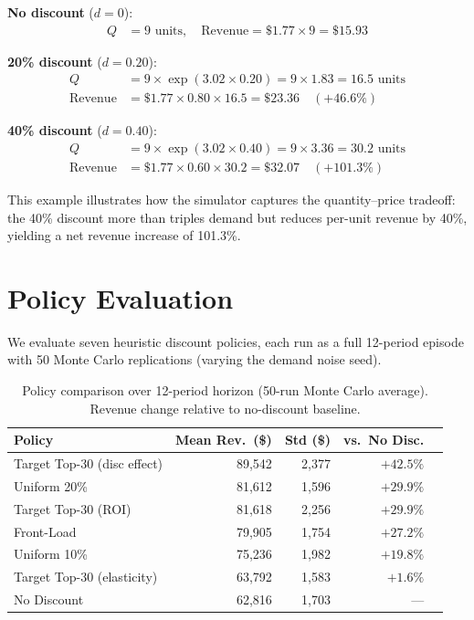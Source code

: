 \documentclass[12pt,a4paper]{article}
\begin{document}
\noindent\textbf{No discount} ($d = 0$):
\begin{align*}
Q &= 9 \text{ units}, \quad
\text{Revenue} = \$1.77 \times 9 = \$15.93
\end{align*}

\noindent\textbf{20\% discount} ($d = 0.20$):
\begin{align*}
Q &= 9 \times \exp(3.02 \times 0.20) = 9 \times 1.83 = 16.5
\text{ units} \\
\text{Revenue} &= \$1.77 \times 0.80 \times 16.5 = \$23.36
\quad (+46.6\%)
\end{align*}

\noindent\textbf{40\% discount} ($d = 0.40$):
\begin{align*}
Q &= 9 \times \exp(3.02 \times 0.40) = 9 \times 3.36 = 30.2
\text{ units} \\
\text{Revenue} &= \$1.77 \times 0.60 \times 30.2 = \$32.07
\quad (+101.3\%)
\end{align*}

This example illustrates how the simulator captures the
quantity--price tradeoff: the 40\% discount more than triples demand
but reduces per-unit revenue by 40\%, yielding a net revenue increase
of 101.3\%.

\section{Policy Evaluation}
\label{sec:policy}

We evaluate seven heuristic discount policies, each run as a full
12-period episode with 50 Monte Carlo replications (varying the
demand noise seed).

\begin{table}[H]
\centering
\caption{Policy comparison over 12-period horizon (50-run Monte Carlo
average). Revenue change relative to no-discount baseline.}
\label{tab:policy-results}
\begin{tabular}{l rrr r}
\toprule
\textbf{Policy} &
\textbf{Mean Rev.\ (\$)} &
\textbf{Std (\$)} &
\textbf{vs.\ No Disc.} \\
\midrule
Target Top-30 (disc effect) & 89,542 & 2,377 & $+42.5\%$ \\
Uniform 20\% & 81,612 & 1,596 & $+29.9\%$ \\
Target Top-30 (ROI) & 81,618 & 2,256 & $+29.9\%$ \\
Front-Load & 79,905 & 1,754 & $+27.2\%$ \\
Uniform 10\% & 75,236 & 1,982 & $+19.8\%$ \\
Target Top-30 (elasticity) & 63,792 & 1,583 & $+1.6\%$ \\
No Discount & 62,816 & 1,703 & --- \\
\bottomrule
\end{tabular}
\end{table}
\end{document}
